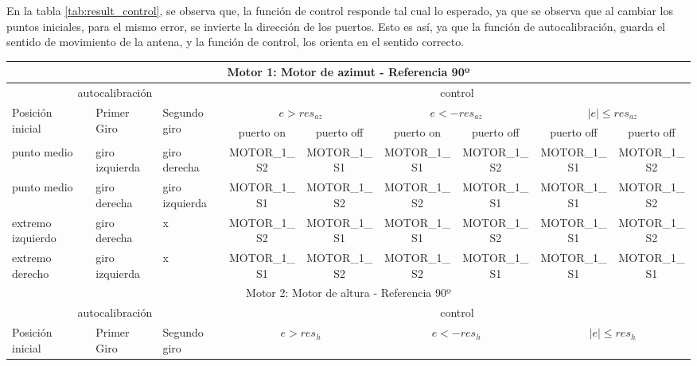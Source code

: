 En la tabla \ref{tab:result_control}, se observa que, la función de control responde tal cual lo esperado, ya que se observa que al cambiar los puntos iniciales, para el mismo error, se invierte la dirección de los puertos. Esto es así, ya que la función de autocalibración, guarda el sentido de movimiento de la antena, y la función de control, los orienta en el sentido correcto.    


\begin{table}[ht]
\resizebox{\linewidth}{!}
{
  \begin{threeparttable}		
	\begin{tabular}{|p{1.5cm}|p{1.5cm}|p{1.5cm}|c|c|c|c|c|c|}
		\hline 
		\multicolumn{9}{|c|}{Motor 1: Motor de azimut - Referencia 90º } \\
		\hline 
		\multicolumn{3}{|c|}{autocalibración} & \multicolumn{6}{c|}{control } \\
		\hline 
		\multirow{2}{1.4cm}{Posición inicial} &\multirow{2}{1.4cm}{ Primer Giro} & \multirow{2}{1.4cm}{Segundo giro} &\multicolumn{2}{c|}{$e>res_{az}$} &\multicolumn{2}{c|}{$e<-res_{az}$} &\multicolumn{2}{c|}{$|e|\leq res_{az}$} \\ \cline{4-9}
		
		 & &  & puerto on & puerto off &puerto on & puerto off&puerto off & puerto off\\ 
		\hline 
		punto medio & giro izquierda & giro derecha & MOTOR\_1\_S2 & MOTOR\_1\_S1  & MOTOR\_1\_S1& MOTOR\_1\_S2& MOTOR\_1\_S1 & MOTOR\_1\_S2 \\ 
		\hline 
		punto medio & giro derecha & giro izquierda &MOTOR\_1\_S1  &MOTOR\_1\_S2
		& MOTOR\_1\_S2&  MOTOR\_1\_S1 &MOTOR\_1\_S1 & MOTOR\_1\_S2 	\\
		\hline 
		extremo izquierdo & giro derecha & x &MOTOR\_1\_S2  & MOTOR\_1\_S1  & MOTOR\_1\_S1& MOTOR\_1\_S2 &MOTOR\_1\_S1 & MOTOR\_1\_S2 \\ 
		\hline 
		extremo derecho & giro izquierda & x & MOTOR\_1\_S1&MOTOR\_1\_S2  & MOTOR\_1\_S2 &MOTOR\_1\_S1 &MOTOR\_1\_S1 &MOTOR\_1\_S1  \\ 
		\hline 
		\hline 
		\multicolumn{9}{|c|}{Motor 2: Motor de altura - Referencia 90º } \\
		\hline 
		\multicolumn{3}{|c|}{autocalibración} & \multicolumn{6}{c|}{control } \\
		\hline 
		\multirow{2}{1.4cm}{Posición inicial} &\multirow{2}{1.4cm}{ Primer Giro} & \multirow{2}{1.4cm}{Segundo giro} &\multicolumn{2}{c|}{$e>res_h$} & \multicolumn{2}{c|}{$e<-res_h$\tnote{1}}  &\multicolumn{2}{c|}{$|e|\leq res_h$} \\ \cline{4-9}
		

\end{tabular}
\end{threeparttable}}
\end{table}
